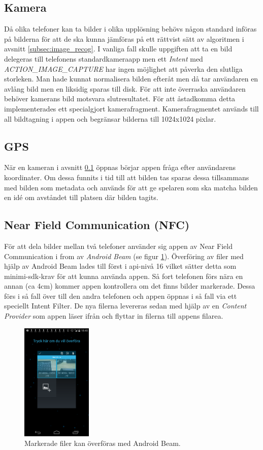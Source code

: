 \documentclass[11px, a4paper, twocolumn]{article}
\begin{document}
\subsection{Kamera}
\label{subsec:camera}
	Då olika telefoner kan ta bilder i olika upplösning behövs någon standard införas på bilderna för att de ska kunna jämföras på ett rättvist sätt av algoritmen i avsnitt \ref{subsec:image_recog}. I vanliga fall skulle uppgiften att ta en bild delegeras till telefonens standardkameraapp men ett \emph{Intent} med \emph{ACTION\_IMAGE\_CAPTURE} har ingen möjlighet att påverka den slutliga storleken. Man hade kunnat normalisera bilden efteråt men då tar användaren en avlång bild men en liksidig sparas till disk. För att inte överraska användaren behöver kamerans bild motsvara slutresultatet. För att åstadkomma detta implementerades ett specialgjort kamerafragment. Kamerafragmentet används till all bildtagning i appen och begränsar bilderna till 1024x1024 pixlar.

\subsection{GPS}
	När en kameran i avsnitt \ref{subsec:camera} öppnas börjar appen fråga efter användarens koordinater. Om dessa funnits i tid till att bilden tas sparas dessa tillsammans med bilden som metadata och används för att ge spelaren som ska matcha bilden en idé om avståndet till platsen där bilden tagits.

\subsection{Near Field Communication (NFC)}
	För att dela bilder mellan två telefoner använder sig appen av Near Field Communication i from av \emph{Android Beam} (se figur \ref{fig:beam}). Överföring av filer med hjälp av Android Beam lades till först i api-nivå 16 vilket sätter detta som minimi-sdk-krav för att kunna använda appen. Så fort telefonen förs nära en annan (ca 4cm) kommer appen kontrollera om det finns bilder markerade. Dessa förs i så fall över till den andra telefonen och appen öppnas i så fall via ett speciellt Intent Filter. De nya filerna levereras sedan med hjälp av en \emph{Content Provider} som appen läser ifrån och flyttar in filerna till appens filarea.

	\begin{figure}[p]
		\centering
	    \includegraphics[width=0.3\textwidth]{img/beam}
		\caption{\label{fig:beam}Markerade filer kan överföras med Android Beam.}
	\end{figure}
\end{document}

